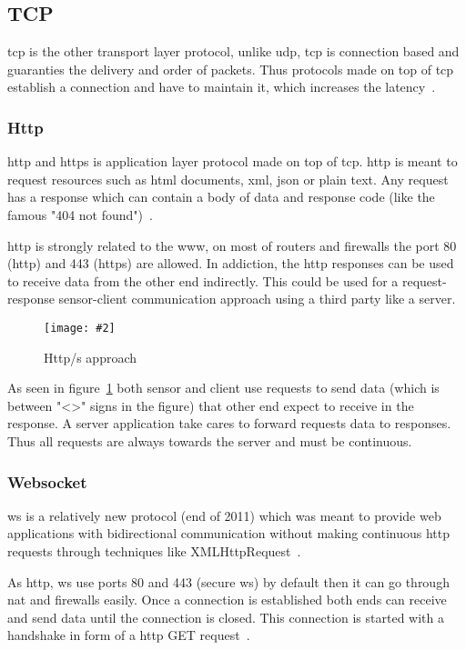 \documentclass[hidelinks,11pt,a4paper,oneside,article]{memoir}
\newcommand{\putimage}[3][10] %
{
\begin{figure}[h]
	\centering
	\captionsetup{justification=centering}
	\texttt{[image: \#2]}
	\caption{#3}
	\label{fig:#2}
\end{figure}
}
\begin{document}
\subsection{TCP}
\gls{tcp} is the other transport layer protocol, unlike \gls{udp}, \gls{tcp} is connection based and guaranties the delivery and order of packets. Thus protocols made on top of \gls{tcp} establish a connection and have to maintain it, which increases the latency~\cite[19]{tcpip}.

\subsubsection{Http}\label{sec:http}
\gls{http} and \gls{https} is application layer protocol made on top of \gls{tcp}. \gls{http} is meant to request resources such as \gls{html} documents, \gls{xml}, \gls{json} or plain text. Any request has a response which can contain a body of data and response code (like the famous "404 not found")~\cite{http-rfc}.

\gls{http} is strongly related to the \gls{www}, on most of routers and firewalls the port 80 (\gls{http}) and 443 (\gls{https}) are allowed. In addiction, the \gls{http} responses can be used to receive data from the other end indirectly. This could be used for a request-response sensor-client communication approach using a third party like a server.

\putimage[14]{http-approach}{Http/s approach}

As seen in figure~\ref{fig:http-approach} both sensor and client use requests to send data (which is between "<>" signs in the figure) that other end expect to receive in the response. A server application take cares to forward requests data to responses. Thus all requests are always towards the server and must be continuous.

\subsubsection{Websocket}
\gls{ws} is a relatively new protocol (end of 2011) which was meant to provide web applications with bidirectional communication without making continuous \gls{http} requests through techniques like XMLHttpRequest~\cite[4]{rfc6455}.

As \gls{http}, \gls{ws} use ports 80 and 443 (secure \gls{ws}) by default then it can go through \gls{nat} and firewalls easily. Once a connection is established both ends can receive and send data until the connection is closed. This connection is started with a handshake in form of a \gls{http} GET request~\cite[6]{rfc6455}. 
\end{document}
